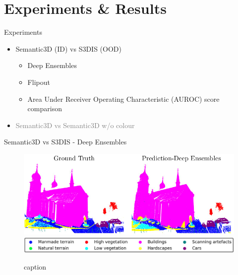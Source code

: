 \documentclass[aspectratio=169]{beamer}
\begin{document}
\section{Experiments \& Results}
\begin{frame}{Experiments}
    \begin{itemize}
        \item Semantic3D (ID) vs S3DIS (OOD)
        \begin{itemize}
            \item Deep Ensembles
            \item Flipout
            \item Area Under Receiver Operating Characteristic (AUROC) score comparison
        \end{itemize}
        \item \textcolor{gray}{Semantic3D vs Semantic3D w/o colour}
    \end{itemize}
\end{frame}
\begin{frame}{Semantic3D vs S3DIS - Deep Ensembles}
    \begin{figure}
        \centering
        \includegraphics[scale=0.5]{images/sem3d/Sem3d_DE_output.jpg}
        \includegraphics[scale=0.25]{images/legend.jpg}
        \caption{caption}
        \label{fig:sem3d_de_op}
    \end{figure}
\end{frame}
\end{document}

